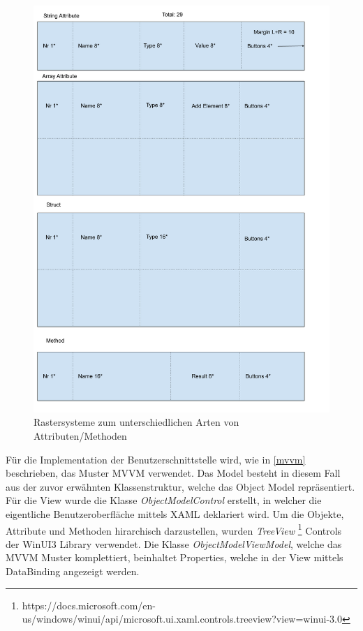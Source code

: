 \begin{figure}
   \centering
   \includegraphics[width=1.0\textwidth]{gfx/Single Object Content Grid.png}
   \caption{
      Rastersysteme zum unterschiedlichen Arten von Attributen/Methoden
      }
      \label{fig:singleObjectContentGrid}
\end{figure}


Für die Implementation der Benutzerschnittstelle wird, wie in \ref{mvvm} beschrieben, das Muster \ac{MVVM} verwendet.
Das Model besteht in diesem Fall aus der zuvor erwähnten Klassenstruktur, welche das Object Model repräsentiert.
Für die View wurde die Klasse \textit{ObjectModelControl} erstellt, in welcher die eigentliche Benutzeroberfläche mittels XAML deklariert wird.
Um die Objekte, Attribute und Methoden hirarchisch darzustellen, wurden  \textit{TreeView} \footnote{https://docs.microsoft.com/en-us/windows/winui/api/microsoft.ui.xaml.controls.treeview?view=winui-3.0} Controls der WinUI3 Library verwendet.
Die Klasse \textit{ObjectModelViewModel}, welche das \ac{MVVM} Muster komplettiert, beinhaltet Properties, welche in der View mittels DataBinding angezeigt werden.

